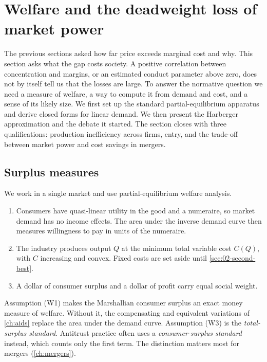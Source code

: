 \section{Welfare and the deadweight loss of market power}\label{sec:02-welfare}

The previous sections asked how far price exceeds marginal cost and why. This section asks what the gap costs
society. A positive correlation between concentration and margins, or an estimated conduct parameter above zero,
does not by itself tell us that the losses are large. To answer the normative question we need a measure of welfare,
a way to compute it from demand and cost, and a sense of its likely size. We first set up the standard
partial-equilibrium apparatus and derive closed forms for linear demand. We then present the Harberger
approximation and the debate it started. The section closes with three qualifications: production inefficiency
across firms, entry, and the trade-off between market power and cost savings in mergers.

\subsection{Surplus measures}\label{sec:02-surplus}

We work in a single market and use partial-equilibrium welfare analysis.

\begin{assumption}\label{ass:02-welfare}
\leavevmode
\begin{enumerate}[label=(W\arabic*)]
\item Consumers have quasi-linear utility in the good and a numeraire, so market demand has no income effects.
      The area under the inverse demand curve then measures willingness to pay in units of the numeraire.
\item The industry produces output $Q$ at the minimum total variable cost $C(Q)$, with $C$ increasing and
      convex. Fixed costs are set aside until \cref{sec:02-second-best}.
\item A dollar of consumer surplus and a dollar of profit carry equal social weight.
\end{enumerate}
\end{assumption}

Assumption (W1) makes the Marshallian consumer surplus an exact money measure of welfare. Without it, the
compensating and equivalent variations of \cref{ch:aids} replace the area under the demand curve. Assumption (W3)
is the \emph{total-surplus standard}. Antitrust practice often uses a \emph{consumer-surplus standard} instead,
which counts only the first term. The distinction matters most for mergers (\cref{ch:mergers}).

